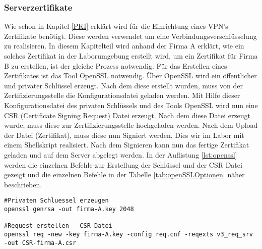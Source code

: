 \subsubsection{Serverzertifikate}
Wie schon in Kapitel \ref{PKI} erklärt wird für die  Einrichtung eines VPN's Zertifikate benötigt. Diese werden verwendet um eine Verbindungsverschlüsselung zu realisieren. In diesem Kapitelteil wird anhand der Firma A erklärt, wie ein solches Zertifikat in der Laborumgebung erstellt wird, um ein Zertifikat für Firma B zu erstellen, ist der gleiche Prozess notwendig. \newline
Für das Erstellen eines Zertifikates ist das Tool OpenSSL notwendig. Über OpenSSL wird ein öffentlicher und privater Schlüssel erzeugt. Nach dem diese erstellt wurden, muss von der Zertifizierungsstelle die Konfigurationsdatei geladen werden. Mit Hilfe dieser Konfigurationsdatei des privaten Schlüssels und des Tools OpenSSL wird nun eine CSR (Certificate Signing Request) Datei erzeugt. Nach dem diese Datei erzeugt wurde, muss diese zur Zertifizierungsstelle hochgeladen werden. Nach dem Upload der Datei (Zertifikat), muss diese nun Signiert werden. Dies wir im Labor mit einem Shellskript realisiert. Nach dem Signieren kann nun das fertige Zertifikat geladen und auf dem Server 
abgelegt werden. In der Auflistung \ref{lst:openssl}  werden die einzelnen Befehle zur Erstellung der Schlüssel und der CSR Datei gezeigt und die einzelnen Befehle in der Tabelle \ref{tab:openSSLOptionen} näher beschrieben.\newline
\lstset{
	basicstyle=\footnotesize, frame=tb,
	xleftmargin=.2\textwidth, xrightmargin=.2\textwidth
}
\begin{lstlisting}[caption={Erzeugen eines privaten Schlüssels mit OpenSSL},label=lst:openssl]
#Privaten Schluessel erzeugen
openssl genrsa -out firma-A.key 2048

#Request erstellen - CSR-Datei
openssl req -new -key firma-A.key -config req.cnf -reqexts v3_req_srv -out CSR-firma-A.csr
\end{lstlisting}
\vspace{\baselineskip}

